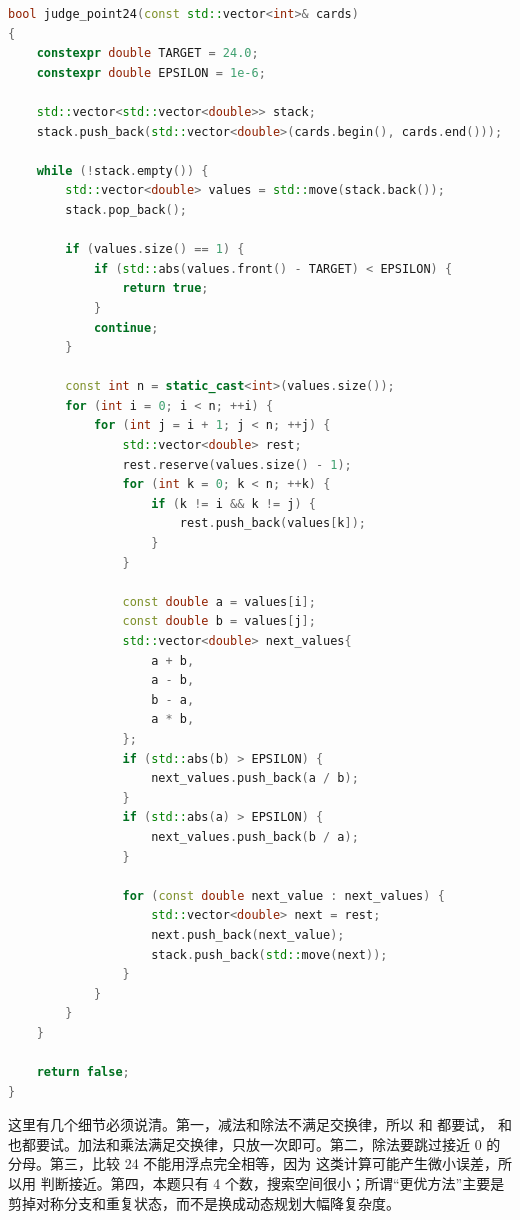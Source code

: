 \begin{lstlisting}[language=C++,caption={LeetCode 679 24 点游戏：显式状态栈搜索数字集合}]
bool judge_point24(const std::vector<int>& cards)
{
    constexpr double TARGET = 24.0;
    constexpr double EPSILON = 1e-6;

    std::vector<std::vector<double>> stack;
    stack.push_back(std::vector<double>(cards.begin(), cards.end()));

    while (!stack.empty()) {
        std::vector<double> values = std::move(stack.back());
        stack.pop_back();

        if (values.size() == 1) {
            if (std::abs(values.front() - TARGET) < EPSILON) {
                return true;
            }
            continue;
        }

        const int n = static_cast<int>(values.size());
        for (int i = 0; i < n; ++i) {
            for (int j = i + 1; j < n; ++j) {
                std::vector<double> rest;
                rest.reserve(values.size() - 1);
                for (int k = 0; k < n; ++k) {
                    if (k != i && k != j) {
                        rest.push_back(values[k]);
                    }
                }

                const double a = values[i];
                const double b = values[j];
                std::vector<double> next_values{
                    a + b,
                    a - b,
                    b - a,
                    a * b,
                };
                if (std::abs(b) > EPSILON) {
                    next_values.push_back(a / b);
                }
                if (std::abs(a) > EPSILON) {
                    next_values.push_back(b / a);
                }

                for (const double next_value : next_values) {
                    std::vector<double> next = rest;
                    next.push_back(next_value);
                    stack.push_back(std::move(next));
                }
            }
        }
    }

    return false;
}
\end{lstlisting}

这里有几个细节必须说清。第一，减法和除法不满足交换律，所以  和  都要试， 和  也都要试。加法和乘法满足交换律，只放一次即可。第二，除法要跳过接近 0 的分母。第三，比较 24 不能用浮点完全相等，因为  这类计算可能产生微小误差，所以用  判断接近。第四，本题只有 4 个数，搜索空间很小；所谓“更优方法”主要是剪掉对称分支和重复状态，而不是换成动态规划大幅降复杂度。

